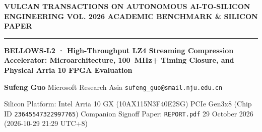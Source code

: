 \documentclass[11pt,a4paper]{article}
\begin{document}
{\scriptsize\sffamily\textcolor{vulcan}{\textbf{VULCAN TRANSACTIONS ON AUTONOMOUS AI-TO-SILICON ENGINEERING \hfill VOL. 2026 \textperiodcentered{} ACADEMIC BENCHMARK \& SILICON PAPER}}\par}

\vspace{1pt}\textcolor{vulcan}{\rule{\textwidth}{1.2pt}}\vspace{3pt}

\begin{center}

{\sffamily\LARGE\bfseries BELLOWS-L2 · High-Throughput LZ4 Streaming Compression Accelerator: Microarchitecture, 100~MHz+ Timing Closure, and Physical Arria 10 FPGA Evaluation\par}\vspace{3pt}

{\small\sffamily\textbf{Sufeng Guo} \textperiodcentered{} Microsoft Research Asia \textperiodcentered{} \texttt{sufeng\_guo@smail.nju.edu.cn}\par}\vspace{1pt}

{\scriptsize\sffamily\textcolor{black!75}{Silicon Platform: Intel Arria 10 GX (\allowbreak{}10AX115N3F40E2SG)\allowbreak{} PCIe Gen3x8 (Chip ID \texttt{23645547322997765}) \textperiodcentered{} Companion Signoff Paper: \texttt{REPORT.pdf} \textperiodcentered{} 29 October 2026 (\allowbreak{}2026-10-29 21:29 UTC+\allowbreak{}8)\allowbreak{}}\par}

\end{center}\vspace{2pt}
\end{document}
